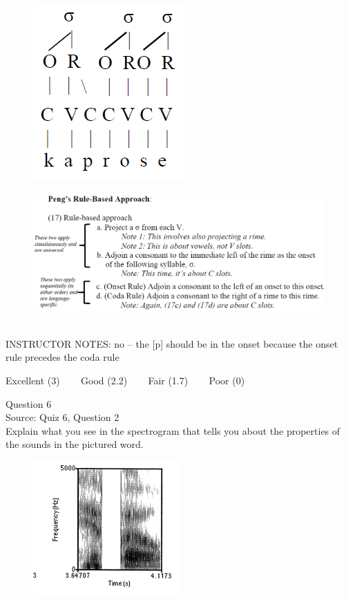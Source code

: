 \documentclass[12pt]{article}
\begin{document}
\begin{figure}[H]
\includegraphics{../images/pengrules_kaprose_no.png}
\end{figure}
\begin{figure}[H]
\includegraphics{../images/peng_rules.png}
\end{figure}

~\\
INSTRUCTOR NOTES: no -- the [p] should be in the onset because the onset rule precedes the coda rule


\vfill
Excellent (3) ~~~ Good (2.2) ~~~ Fair (1.7) ~~~ Poor (0)
\newpage

{\large Question 6}\\

Source: Quiz 6, Question 2\\

Explain what you see in the spectrogram that tells you about the properties of the sounds in the pictured word.\\

\begin{figure}[H]
\includegraphics{../images/spectrogram_hippo.png}
\end{figure}
\end{document}
